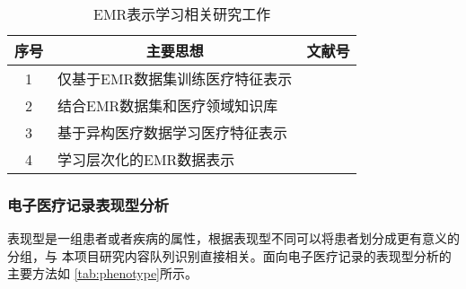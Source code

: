 \begin{table}
    \renewcommand\arraystretch{1.5}
    \begin{small}
        \caption{EMR表示学习相关研究工作}
        \label{tab:representation}
        \begin{center}
            \begin{tabular}[c]{cll}
                \toprule
                \multicolumn{1}{c}{\textbf{序号}} &
                \multicolumn{1}{c}{\textbf{主要思想}} &
                \multicolumn{1}{c}{\textbf{文献号}}\\
                \midrule
                1 & 仅基于EMR数据集训练医疗特征表示 & \cite{tran2015learning}
                \cite{miotto2016deep} \cite{choi2016medical}
                 \cite{cai2018medical} \cite{peng2019temporal}
                 \cite{bai2019medical}\\
                2 & 结合EMR数据集和医疗领域知识库 & \cite{choi2017gram}
                \cite{choi2018mime} \cite{ma2018kame} \cite{song2019medical}\\
                3 & 基于异构医疗数据学习医疗特征表示 & \cite{choi2016learning}
                \cite{bai2017joint} \cite{ma2018drug}\\
                4 & 学习层次化的EMR数据表示 & \cite{choi2016multi}
                \cite{choi2020learning}\\
                \bottomrule
            \end{tabular}
        \end{center}
    \end{small}
\end{table}

{}

\subsubsection{电子医疗记录表现型分析}

表现型是一组患者或者疾病的属性，根据表现型不同可以将患者划分成更有意义的分组，与
本项目研究内容队列识别直接相关。面向电子医疗记录的表现型分析的主要方法如
\cref{tab:phenotype}所示。


